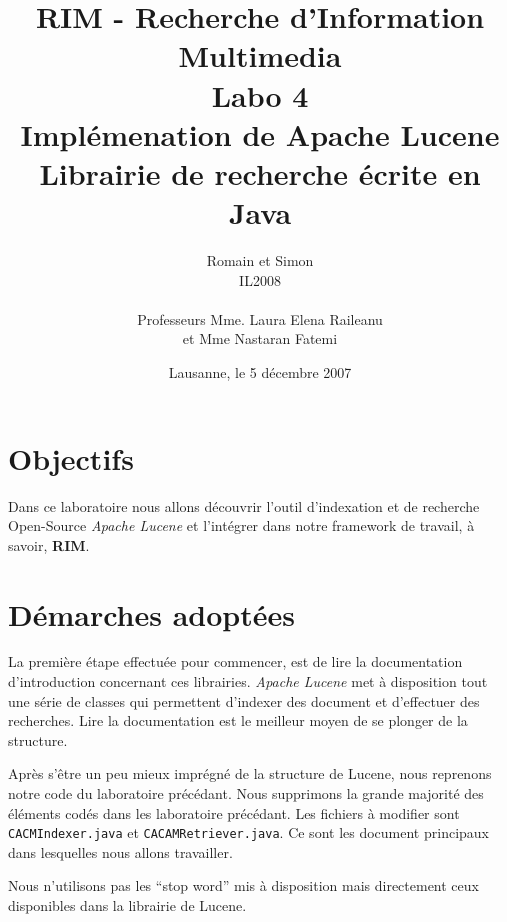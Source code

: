 \documentclass[a4paper, 11pt]{article}
\title{ %
\small{RIM - Recherche d'Information Multimedia} \\ \vspace{2cm}
\huge{Labo 4} \\ \vspace{1cm} 
Implémenation de Apache Lucene \\ 
\small{Librairie de recherche écrite en Java}}
\author{Romain \bsc{de Wolff} et Simon \bsc{Hintermann}\\ IL2008 \\ \vspace{2cm} \\ Professeurs Mme. Laura Elena Raileanu \\ et Mme Nastaran Fatemi \vspace{2cm} 
}
\date{Lausanne, le 5 décembre 2007}  %
\begin{document}
\maketitle
\thispagestyle{empty} %
\newpage
 \setcounter{page}{1} 

{\setlength{\baselineskip}{1.2\baselineskip}
\parskip=12pt
\section{Objectifs} 

Dans ce laboratoire nous allons découvrir l'outil d'indexation et de recherche Open-Source \emph{Apache Lucene} et l'intégrer dans notre framework de travail, à savoir, \textbf{RIM}.



\section{Démarches adoptées} 

La première étape effectuée pour commencer, est de lire la documentation d'introduction concernant ces librairies. \emph{Apache Lucene} met à disposition tout une série de classes qui permettent d'indexer des document et d'effectuer des recherches. Lire la documentation est le meilleur moyen de se plonger de la structure. 


Après s'être un peu mieux imprégné de la structure de Lucene, nous reprenons notre code du laboratoire précédant. Nous supprimons la grande majorité des éléments codés dans les laboratoire précédant. Les fichiers à modifier sont \texttt{CACMIndexer.java} et \texttt{CACAMRetriever.java}. Ce sont les document principaux dans lesquelles nous allons travailler.

Nous n'utilisons pas les “stop word” mis à disposition mais directement ceux disponibles dans la librairie de Lucene.

}
\end{document}
